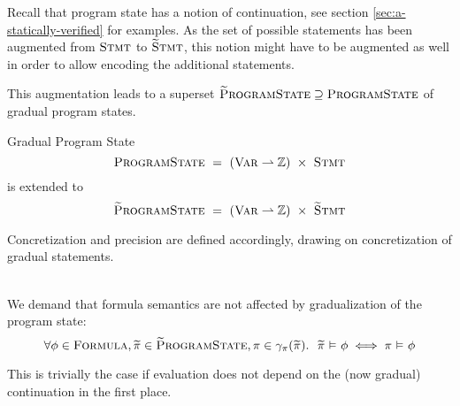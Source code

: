 Recall that program state has a notion of continuation, see section \ref{sec:a-statically-verified} for examples.
As the set of possible statements has been augmented from $\textup{\textsc{Stmt}}$ to $\textup{\textsc{\ensuremath{\widetilde{\text{S}}}tmt}}$, this notion might have to be augmented as well in order to allow encoding the additional statements.

This augmentation leads to a superset $\textup{\textsc{\ensuremath{\widetilde{\text{P}}}rogramState}} \supseteq \textup{\textsc{ProgramState}}$ of gradual program states.
\begin{example}{Gradual Program State}
\label{ex:grad-ps}
$$\textup{\textsc{ProgramState}} ~  =~ (\textup{\textsc{Var}} \rightharpoonup \mathbb{Z}) ~\times~ \textup{\textsc{Stmt}}$$
is extended to
$$\textup{\textsc{\ensuremath{\widetilde{\text{P}}}rogramState}} ~ =~ (\textup{\textsc{Var}} \rightharpoonup \mathbb{Z}) ~\times~ \textup{\textsc{\ensuremath{\widetilde{\text{S}}}tmt}}$$
\end{example}

Concretization and precision are defined accordingly, drawing on concretization of gradual statements.

\begin{comment}
Consequence:
\begin{displaymath}
\forall \grad{\pi_{\grad{s}}} \in \setGProgramState_{\grad{s}}, \pi \in \gamma_{\pi}(\grad{\pi_{\grad{s}}}).~ \exists s \in \gamma_s(\grad{s}).~ \pi \in \setProgramState_s
\end{displaymath}
\end{comment}

\begin{lemma}
    \label{lemma:gradPS-form-sem}~\\
    We demand that formula semantics are not affected by gradualization of the program state:
    \begin{displaymath}
    \forall \phi \in \textup{\textsc{Formula}}, \widetilde{\pi} \in \textup{\textsc{\ensuremath{\widetilde{\text{P}}}rogramState}}, \pi \in \gamma_{\pi}(\widetilde{\pi}).~~ \widetilde{\pi} \,\,{\vDash}\,\, \phi \iff \pi \,\,{\vDash}\,\, \phi
    \end{displaymath}
    
    This is trivially the case if evaluation does not depend on the (now gradual) continuation in the first place.
\end{lemma}

